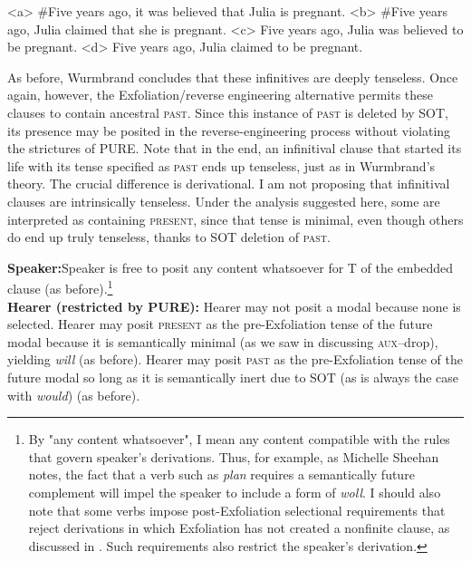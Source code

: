 \documentclass[output=paper]{langscibook}
\begin{document}
\a<a>  \#Five years ago, it was believed that Julia is pregnant.
\a<b>  \#Five years ago, Julia claimed that she is pregnant.
\a<c>  Five years ago, Julia was believed to be pregnant.
\a<d>  Five years ago, Julia claimed to be pregnant.
\xe

\noindent As before, Wurmbrand concludes that these infinitives are deeply tenseless. Once again, however, the Exfoliation/reverse engineering alternative permits these clauses to contain ancestral \textsc{past}. Since this instance of \textsc{past }is deleted by SOT, its presence may be posited in the reverse-engineering process without violating the strictures of PURE. Note that in the end, an infinitival clause that started its life with its tense specified as \textsc{past }ends up tenseless, just as in Wurmbrand's theory. The crucial difference is derivational. I am not proposing that infinitival clauses are intrinsically tenseless. Under the analysis suggested here, some are interpreted as containing \textsc{present}, since that tense is minimal, even though others do end\textsc{ }up truly tenseless, thanks to SOT deletion of \textsc{past}. 

\pex
{}\medbreak
\textbf{Speaker:}\newline Speaker is free to posit any content whatsoever for T of the embedded clause (as before).\footnote{By "any content whatsoever", I mean any content compatible with the rules that govern speaker's derivations.  Thus, for example, as Michelle Sheehan notes, the fact that a verb such as \textit{plan} requires a semantically future complement will impel the speaker to include a form of \textit{woll}. I should also note that some verbs impose post-Exfoliation selectional requirements that reject derivations in which Exfoliation has not created a nonfinite clause, as discussed in \citet{Pesetsky:2019aa}. Such requirements also restrict the speaker's derivation.}
 \\[.5\baselineskip]
\textbf{Hearer (restricted by PURE):}
\a Hearer may not posit a modal because none is selected.
\a Hearer may posit \textsc{present} as the pre-Exfoliation tense of the future modal because it is semantically minimal (as we saw in discussing \textsc{aux}--drop), yielding \textit{will} (as before).
\a Hearer may posit \textsc{past} as the pre-Exfoliation tense of the future modal so long as it is semantically inert due to SOT (as is always the case with \textit{would}) (as before).
\xe
\end{document}
